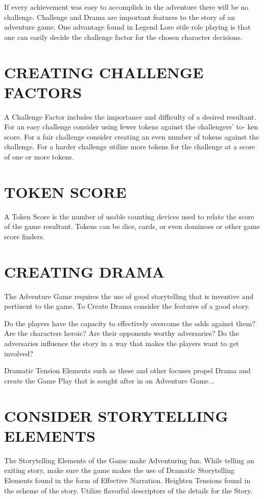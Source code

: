 \documentclass{article}
\begin{document}
	If every achievement was easy to accomplish in the adventure there will be no challenge.
Challenge and Drama are important features to the story of an adventure game. One advantage
found in Legend Lore stile role playing is that one can easily decide the challenge factor for the
chosen character decisions.

\section{CREATING CHALLENGE FACTORS}

	A Challenge Factor includes the importance and difficulty of a desired resultant. For an easy
challenge consider using fewer tokens against the challengers’ to- ken score. For a fair challenge
consider creating an even number of tokens against the challenge. For a harder challenge utilize
more tokens for the challenge at a score of one or more tokens.

\section{TOKEN SCORE}

A Token Score is the number of usable counting devices used to relate the score of the game
resultant. Tokens can be dice, cards, or even dominoes or other game score finders.

\section{CREATING DRAMA}

	The Adventure Game requires the use of good storytelling that is inventive and pertinent to the
game. To Create Drama consider the features of a good story.

	Do the players have the capacity to effectively overcome the odds against them? Are the
characters heroic? Are their opponents worthy adversaries? Do the adversaries influence the
story in a way that makes the players want to get involved?

	Dramatic Tension Elements such as these and other focuses propel Drama and create the Game
Play that is sought after in an Adventure Game...

\section{CONSIDER STORYTELLING ELEMENTS}

	The Storytelling Elements of the Game make Adventuring fun. While telling an exiting story,
make sure the game makes the use of Dramatic Storytelling Elements found in the form of
Effective Narration. Heighten Tensions found in the scheme of the story. Utilize flavorful
descriptors of the details for the Story.
\end{document}
